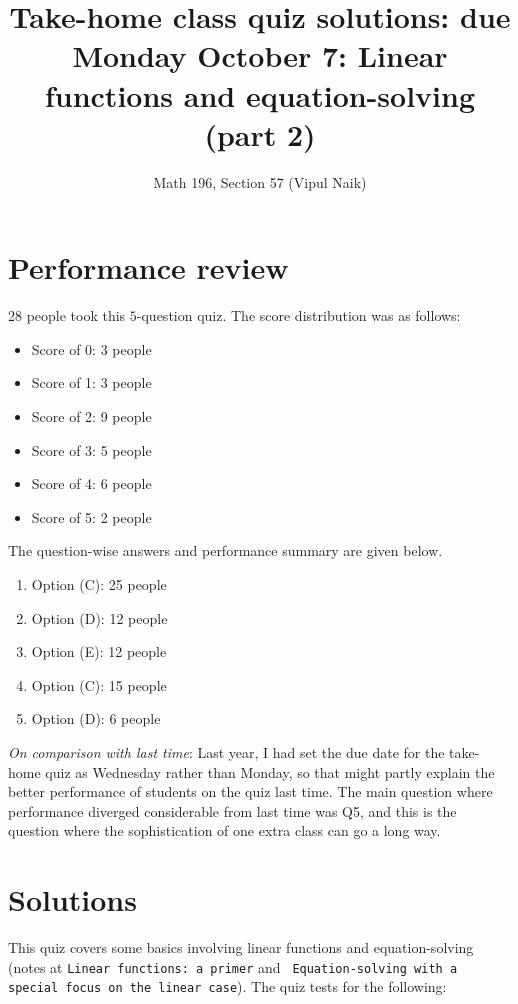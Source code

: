 \documentclass[10pt]{amsart}
\title{Take-home class quiz solutions: due Monday October 7: Linear functions and equation-solving (part 2)}
\author{Math 196, Section 57 (Vipul Naik)}
\begin{document}
\maketitle

\section{Performance review}

28 people took this $5$-question quiz. The score distribution was as
follows:

\begin{itemize}
\item Score of 0: 3 people
\item Score of 1: 3 people
\item Score of 2: 9 people
\item Score of 3: 5 people
\item Score of 4: 6 people
\item Score of 5: 2 people
\end{itemize}

The question-wise answers and performance summary are given below.

\begin{enumerate}
\item Option (C): 25 people
\item Option (D): 12 people
\item Option (E): 12 people
\item Option (C): 15 people
\item Option (D): 6 people
\end{enumerate}

{\em On comparison with last time}: Last year, I had set the due date
for the take-home quiz as Wednesday rather than Monday, so that might
partly explain the better performance of students on the quiz last
time. The main question where performance diverged considerable from
last time was Q5, and this is the question where the sophistication of
one extra class can go a long way.

\section{Solutions}

This quiz covers some basics involving linear functions and
equation-solving (notes at {\tt Linear functions: a primer} and {\tt
  Equation-solving with a special focus on the linear case}). The quiz
tests for the following:
\end{document}
